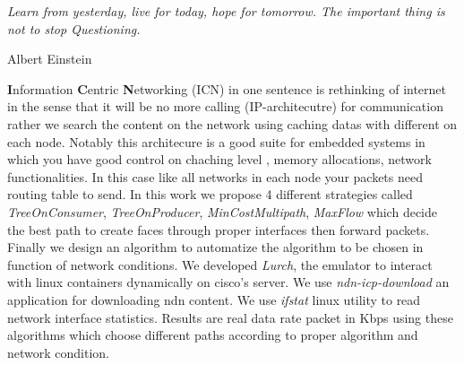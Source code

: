 \documentclass[11pt, oneside]{Thesis} %
\begin{document}
\textit{Learn from yesterday, live for today, hope for tomorrow. The important thing is not to stop Questioning.}

\begin{flushright}
Albert Einstein
\end{flushright}

\vfill\vfill\vfill\vfill\vfill\vfill\null %

\clearpage %



\abstract %
\textbf{I}nformation \textbf{C}entric \textbf{N}etworking (ICN) in one sentence is rethinking of internet in the sense that it will be no more calling (IP-architecutre) for communication rather we search the content on the network using caching datas with different on each node. Notably this architecure is a good suite for embedded systems in which you have good control on chaching level , memory allocations, network functionalities. In this case like all networks in each node your packets need routing table to send. In this work we propose 4 different strategies called \textit{TreeOnConsumer}, \textit{TreeOnProducer}, \textit{MinCostMultipath}, \textit{MaxFlow} which decide the best path to create faces through proper interfaces then forward packets. Finally we design an algorithm to automatize the algorithm to be chosen in function of network conditions. We developed \textit{Lurch}, the emulator to interact with linux containers dynamically on cisco's server. We use \textit{ndn-icp-download} an application for downloading ndn content. We use \textit{ifstat} linux utility to read network interface statistics.  
Results are real data rate packet in Kbps using these algorithms which choose different paths according to proper algorithm and network condition.



%
\clearpage %
\end{document}
